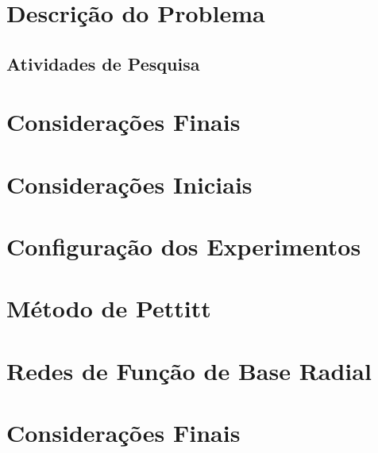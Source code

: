 \documentclass[qual, classic, a4paper]{ufbathesis}
\begin{document}
\section{Descrição do Problema}
\blindtext

\subsection{Atividades de Pesquisa}
\blindtext

\section{Considerações Finais}
\blindtext

 \label{experimentos_iniciais}
\section{Considerações Iniciais}
\blindtext

\section{Configuração dos Experimentos}
\blindtext

\section{Método de Pettitt}
\blindtext

\section{Redes de Função de Base Radial}
\blindtext

\section{Considerações Finais}
\blindtext


\backmatter





%
% 
% 

\end{document}
